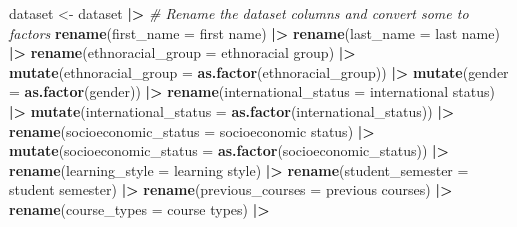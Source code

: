\documentclass[
  twocolumn]{article}
\newenvironment{Shaded}{\begin{snugshade}}{\end{snugshade}}
\newcommand{\AttributeTok}[1]{\textcolor[rgb]{0.13,0.29,0.53}{#1}}
\newcommand{\CommentTok}[1]{\textcolor[rgb]{0.56,0.35,0.01}{\textit{#1}}}
\newcommand{\FunctionTok}[1]{\textcolor[rgb]{0.13,0.29,0.53}{\textbf{#1}}}
\newcommand{\NormalTok}[1]{#1}
\newcommand{\OtherTok}[1]{\textcolor[rgb]{0.56,0.35,0.01}{#1}}
\newcommand{\SpecialCharTok}[1]{\textcolor[rgb]{0.81,0.36,0.00}{\textbf{#1}}}
\newcommand{\StringTok}[1]{\textcolor[rgb]{0.31,0.60,0.02}{#1}}
\begin{document}
\begin{Shaded}
\begin{Highlighting}[]
\NormalTok{dataset }\OtherTok{\textless{}{-}}\NormalTok{ dataset }\SpecialCharTok{|\textgreater{}} \CommentTok{\# Rename the dataset columns and convert some to factors}
  \FunctionTok{rename}\NormalTok{(}\AttributeTok{first\_name =} \StringTok{\textasciigrave{}}\AttributeTok{first name}\StringTok{\textasciigrave{}}\NormalTok{) }\SpecialCharTok{|\textgreater{}}
  \FunctionTok{rename}\NormalTok{(}\AttributeTok{last\_name =} \StringTok{\textasciigrave{}}\AttributeTok{last name}\StringTok{\textasciigrave{}}\NormalTok{) }\SpecialCharTok{|\textgreater{}}
  \FunctionTok{rename}\NormalTok{(}\AttributeTok{ethnoracial\_group =} \StringTok{\textasciigrave{}}\AttributeTok{ethnoracial group}\StringTok{\textasciigrave{}}\NormalTok{) }\SpecialCharTok{|\textgreater{}}
  \FunctionTok{mutate}\NormalTok{(}\AttributeTok{ethnoracial\_group =} \FunctionTok{as.factor}\NormalTok{(ethnoracial\_group)) }\SpecialCharTok{|\textgreater{}}
  \FunctionTok{mutate}\NormalTok{(}\AttributeTok{gender =} \FunctionTok{as.factor}\NormalTok{(gender)) }\SpecialCharTok{|\textgreater{}}
  \FunctionTok{rename}\NormalTok{(}\AttributeTok{international\_status =} \StringTok{\textasciigrave{}}\AttributeTok{international status}\StringTok{\textasciigrave{}}\NormalTok{) }\SpecialCharTok{|\textgreater{}}
  \FunctionTok{mutate}\NormalTok{(}\AttributeTok{international\_status =} \FunctionTok{as.factor}\NormalTok{(international\_status)) }\SpecialCharTok{|\textgreater{}}
  \FunctionTok{rename}\NormalTok{(}\AttributeTok{socioeconomic\_status =} \StringTok{\textasciigrave{}}\AttributeTok{socioeconomic status}\StringTok{\textasciigrave{}}\NormalTok{) }\SpecialCharTok{|\textgreater{}}
  \FunctionTok{mutate}\NormalTok{(}\AttributeTok{socioeconomic\_status =} \FunctionTok{as.factor}\NormalTok{(socioeconomic\_status)) }\SpecialCharTok{|\textgreater{}}
  \FunctionTok{rename}\NormalTok{(}\AttributeTok{learning\_style =} \StringTok{\textasciigrave{}}\AttributeTok{learning style}\StringTok{\textasciigrave{}}\NormalTok{) }\SpecialCharTok{|\textgreater{}}
  \FunctionTok{rename}\NormalTok{(}\AttributeTok{student\_semester =} \StringTok{\textasciigrave{}}\AttributeTok{student semester}\StringTok{\textasciigrave{}}\NormalTok{) }\SpecialCharTok{|\textgreater{}}
  \FunctionTok{rename}\NormalTok{(}\AttributeTok{previous\_courses =} \StringTok{\textasciigrave{}}\AttributeTok{previous courses}\StringTok{\textasciigrave{}}\NormalTok{) }\SpecialCharTok{|\textgreater{}}
  \FunctionTok{rename}\NormalTok{(}\AttributeTok{course\_types =} \StringTok{\textasciigrave{}}\AttributeTok{course types}\StringTok{\textasciigrave{}}\NormalTok{) }\SpecialCharTok{|\textgreater{}}

\end{Highlighting}
\end{Shaded}
\end{document}
